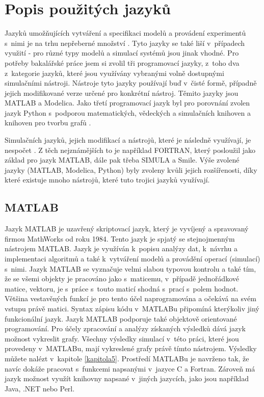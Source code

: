 \section{Popis použitých jazyků}
\label{popis-jazyky}
Jazyků umožňujících vytváření a specifikaci modelů a provádení experimentů s~nimi je na trhu nepřeberné množství \cite{list-of-process-modelling-lang}. Tyto jazyky se také liší v~případech využití - pro různé typy modelů a simulací systémů jsou jinak vhodné. Pro potřeby bakalářské práce jsem si zvolil tři programovací jazyky, z~toho dva z~kategorie jazyků, které jsou využívány vybranými volně dostupnými simulačními nástroji. Nástroje tyto jazyky používají buď v~čisté formě, případně jejich modifikované verze určené pro konkrétní nástroj. Těmito jazyky jsou MATLAB\cite{MATLAB:2010} a Modelica\cite{Fritzson02modelica--}. Jako třetí programovací jazyk byl pro porovnání zvolen jazyk Python s~podporou matematických, vědeckých a simulačních knihoven a knihoven pro tvorbu grafů \cite{scipy}. 

Simulačních jazyků, jejich modifikací a nástrojů, které je následně využívají, je nespočet \cite{list}. Z těch nejznámějších to je například FORTRAN, který posloužil jako základ pro jazyk MATLAB, dále pak třeba SIMULA a Smile. Výše zvolené jazyky (MATLAB, Modelica, Python) byly zvoleny kvůli jejich rozšířenosti, díky které existuje mnoho nástrojů, které tuto trojici jazyků využívají.

\subsection{MATLAB}
\label{matlab-lang}
Jazyk MATLAB je uzavřený skriptovací jazyk, který je vyvíjený a spravovaný firmou MathWorks od roku 1984. Tento jazyk je spjatý se stejnojmenným nástrojem MATLAB. Jazyk je využíván k~popisu analýzy dat, k~návrhu a implementaci algoritmů a také k~vytváření modelů a provádění operací (simulací) s~nimi. Jazyk MATLAB se vyznačuje velmi slabou typovou kontrolu a také tím, že se všemi objekty je pracováno jako s~maticemu, v~případě jednořádkové matice, vektoru, je s~práce s~touto maticí shodná s~prací s~polem hodnot. Většina vestavěných funkcí je pro tento účel naprogramována a očekává na svém vstupu právě matici. Syntax zápisu kódu v~MATLABu připomíná kterýkoliv jiný funkcionální jazyk. Jazyk MATLAB podporuje také objektově orientované programování. Pro účely zpracování a analýzy získaných výsledků dává jazyk možnost vykreslit grafy. Všechny výsledky simulací v~této práci, které jsou provedeny v~MATLABu, mají vykreslené grafy právě tímto nástrojem. Výsledky můžete nalézt v~kapitole \ref{kapitola5}. Prostředí MATLABu je navrženo tak, že navíc dokáže pracovat s~funkcemi napsanými v~jazyce C a Fortran. Zároveň má jazyk možnost využít knihovny napsané v~jiných jazycích, jako jsou například Java, .NET nebo Perl.

